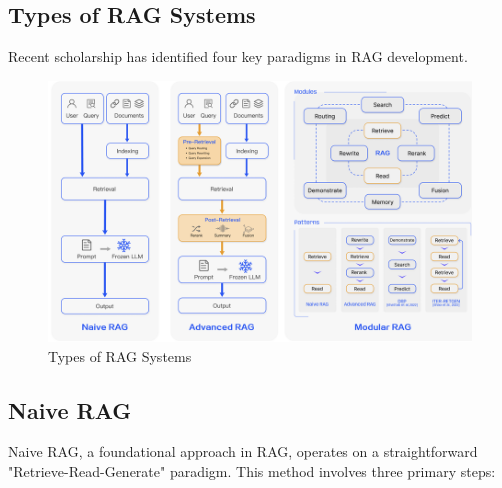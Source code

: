 \subsection{Types of RAG Systems}
Recent scholarship has identified four key paradigms in RAG development\citep{gao2024retrieval, ahmed2024agenticrag}.
\begin{figure}[h]
	\centering
	\includegraphics[width=0.9\linewidth]{Figures/rag_types.png}
	\caption{Types of RAG Systems}
	\label{rag_archi}
\end{figure}

\subsection{Naive RAG}
Naive RAG, a foundational approach in RAG, operates on a straightforward "Retrieve-Read-Generate" paradigm. This method involves three primary steps:

